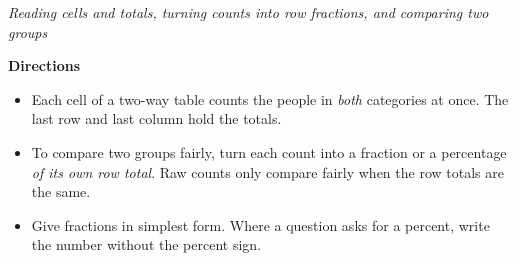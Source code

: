 \documentclass[12pt]{article}
\begin{document}

\begin{center}
\textit{Reading cells and totals, turning counts into row fractions, and comparing two groups}
\end{center}

\vspace{0.05cm}
\noindent\textbf{Directions}
\begin{itemize}[leftmargin=0.9cm, itemsep=1pt, topsep=2pt]
  \item Each cell of a two-way table counts the people in \textit{both} categories at once. The last row and last column hold the totals.
  \item To compare two groups fairly, turn each count into a fraction or a percentage \textit{of its own row total}. Raw counts only compare fairly when the row totals are the same.
  \item Give fractions in simplest form. Where a question asks for a percent, write the number without the percent sign.
\end{itemize}


\end{document}

